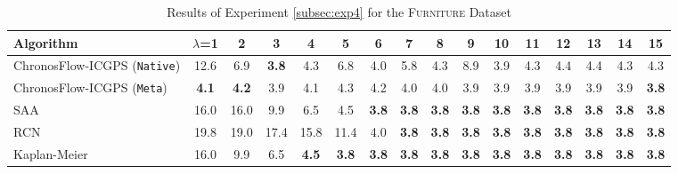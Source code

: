 \documentclass[11pt]{article}
\renewcommand{\arraystretch}{1.15}
\renewcommand{\arraystretch}{0.88}
\begin{document}
\begin{table}[h]
\centering
\caption{Results of Experiment \ref{subsec:exp4} for the \textsc{Furniture} Dataset}
\footnotesize
\setlength{\tabcolsep}{3pt}
\renewcommand{\arraystretch}{1.05}
\begin{adjustbox}{max width=\textwidth,center}
\begin{tabular}{l*{15}{c}}
\toprule
Algorithm & $\lambda$=1 & 2 & 3 & 4 & 5 & 6 & 7 & 8 & 9 & 10 & 11 & 12 & 13 & 14 & 15 \\
\midrule
ChronosFlow-ICGPS (\texttt{Native}) & 12.6 & 6.9 & \textbf{3.8} & 4.3 & 6.8 & 4.0 & 5.8 & 4.3 & 8.9 & 3.9 & 4.3 & 4.4 & 4.4 & 4.3 & 4.3 \\
ChronosFlow-ICGPS (\texttt{Meta}) & \textbf{4.1} & \textbf{4.2} & 3.9 & 4.1 & 4.3 & 4.2 & 4.0 & 4.0 & 3.9 & 3.9 & 3.9 & 3.9 & 3.9 & 3.9 & \textbf{3.8} \\
SAA & 16.0 & 16.0 & 9.9 & 6.5 & 4.5 & \textbf{3.8} & \textbf{3.8} & \textbf{3.8} & \textbf{3.8} & \textbf{3.8} & \textbf{3.8} & \textbf{3.8} & \textbf{3.8} & \textbf{3.8} & \textbf{3.8} \\
RCN \citep{hssaine2024censored} & 19.8 & 19.0 & 17.4 & 15.8 & 11.4 & 4.0 & \textbf{3.8} & \textbf{3.8} & \textbf{3.8} & \textbf{3.8} & \textbf{3.8} & \textbf{3.8} & \textbf{3.8} & \textbf{3.8} & \textbf{3.8} \\
Kaplan-Meier & 16.0 & 9.9 & 6.5 & \textbf{4.5} & \textbf{3.8} & \textbf{3.8} & \textbf{3.8} & \textbf{3.8} & \textbf{3.8} & \textbf{3.8} & \textbf{3.8} & \textbf{3.8} & \textbf{3.8} & \textbf{3.8} & \textbf{3.8} \\
\bottomrule
\end{tabular}
\end{adjustbox}
\label{tab:exp4-real_3}
\end{table}
\end{document}
